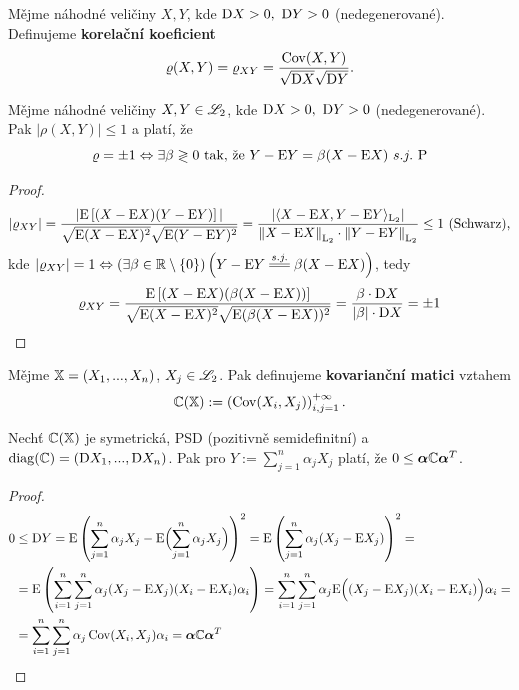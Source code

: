 \begin{define}
	Mějme náhodné veličiny $X,Y$, kde $\mathrm{D} X>0,~\mathrm{D} Y>0$ (nedegenerované). Definujeme \textbf{korelační koeficient} $$\varrho(X,Y)=\varrho_{XY}=\frac{\mathop{\mathrm{Cov}}(X,Y)}{\sqrt{\mathrm{D} X}\sqrt{\mathrm{D} Y}}.$$ 
\end{define}
\begin{theorem}
	Mějme náhodné veličiny $X,Y\in\mathscr{L}_2$, kde $\mathrm{D} X>0,~\mathrm{D} Y>0$ (nedegenerované). Pak $ |\rho(X,Y)|\leq 1 $ a platí, že $$ \varrho = \pm 1 \Leftrightarrow \exists \beta\gtrless 0\text{ tak, že }Y-\mathrm{E} Y=\beta(X-\mathrm{E} X) ~s.j.~\mathrm{P}$$
	\begin{proof}
		$$ |\varrho_{XY}|=\frac{|\mathrm{E} \left[ (X-\mathrm{E} X)(Y-\mathrm{E} Y) \right]|}{\sqrt{\mathrm{E} (X-\mathrm{E} X)^2}\sqrt{\mathrm{E} (Y-\mathrm{E} Y)^2}}=\frac{|\langle X-\mathrm{E} X,Y-\mathrm{E} Y\rangle_{\mathrm{L}_2} |}{\left\| X-\mathrm{E} X \right\|_{\mathrm{L}_2}\cdot \left\| Y-\mathrm{E} Y \right\|_{\mathrm{L}_2}}\leq 1\text{ (Schwarz)}, $$
		kde $|\rho_{XY}|=1\Leftrightarrow(\exists\beta\in\R\setminus\{0\})\left( Y-\E Y\equal{s.j.}\beta(X-\E X) \right)  $, tedy $$ \varrho_{XY}=\frac{\mathrm{E} \left[ (X-\mathrm{E} X)(\beta(X-\mathrm{E} X)) \right]}{\sqrt{\mathrm{E} (X-\mathrm{E} X)^2}\sqrt{\mathrm{E} (\beta(X-\mathrm{E} X))^2}}=\frac{\beta\cdot \mathrm{D} X}{|\beta|\cdot \mathrm{D} X}=\pm 1 $$
	\end{proof}
\end{theorem}
\begin{define}
	Mějme $\mathbb{X}=(X_1,...,X_n)$, $X_j\in\mathscr{L}_2$. Pak definujeme \textbf{kovarianční matici} vztahem
	\[
	\mathbb{C}(\mathbb{X}):=\left( \mathop{\mathrm{Cov}}(X_i,X_j) \right)_{i,j=1}^{+\infty}.
	\]
\end{define}
\begin{theorem}
	Nechť $\mathbb{C}(\mathbb{X})$ je symetrická, PSD (pozitivně semidefinitní) a $\mathop{\mathrm{diag}}(\mathbb{C})=(\mathrm{D} X_1,...,\mathrm{D} X_n)$. Pak pro $Y:=\sum\limits_{j=1}^n\alpha_jX_j$ platí, že $0\leq \boldsymbol\alpha\mathbb{C}\boldsymbol\alpha^T$.
	\begin{proof}
		\[
		\begin{split}
		0&\leq \mathrm{D} Y=\mathrm{E} \left( \sum\limits_{j=1}^n\alpha_jX_j-\mathrm{E} \Bigl( \sum\limits_{j=1}^n\alpha_jX_j \Bigr) \right)^2=\mathrm{E} \left( \sum\limits_{j=1}^n\alpha_j(X_j-\mathrm{E} X_j) \right)^2= \\ 
		&=\mathrm{E} \left( \sum\limits_{i=1}^n\sum\limits_{j=1}^n\alpha_j(X_j-\mathrm{E} X_j)(X_i-\mathrm{E} X_i) \alpha_i\right)= \sum\limits_{i=1}^n\sum\limits_{j=1}^n\alpha_j\mathrm{E} \Bigl((X_j-\mathrm{E} X_j)(X_i-\mathrm{E} X_i) \Bigr)\alpha_i= \\ 
		&=\sum\limits_{i=1}^n\sum\limits_{j=1}^n\alpha_j\mathop{\mathrm{Cov}}(X_i,X_j)\alpha_i=\boldsymbol\alpha\mathbb{C}\boldsymbol\alpha^T
		\end{split}
		\]
	\end{proof}
\end{theorem}
